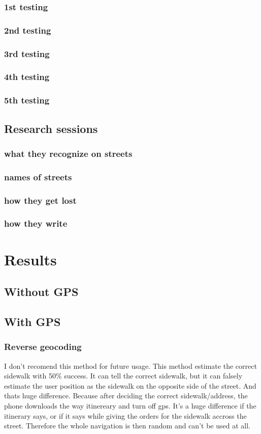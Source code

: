 \documentclass[11pt,oneside,a4paper]{book}
\begin{document}
			\subsection{1st testing}
			\subsection{2nd testing}
			\subsection{3rd testing}
			\subsection{4th testing}
			\subsection{5th testing}
		\section{Research sessions}
			\subsection{what they recognize on streets}
			\subsection{names of streets}
			\subsection{how they get lost}
			\subsection{how they write}
	
	\chapter{Results}
		\section{Without GPS}
		\section{With GPS}
			\subsection{Reverse geocoding}
			I don't recomend this method for future usage. This method estimate the correct sidewalk with 50\% success. It can tell the correct sidewalk, but it can falsely estimate the user position as the sidewalk on the opposite side of the street.  And thats huge difference. 
			Because after deciding the correct sidewalk/address, the phone downloads the way itinereary and turn off gps. It's a huge difference if the itinerary says,  or if it says  while giving the orders for the sidewalk accross the street. Therefore the whole navigation is then random and can't be used at all.
			
\end{document}
